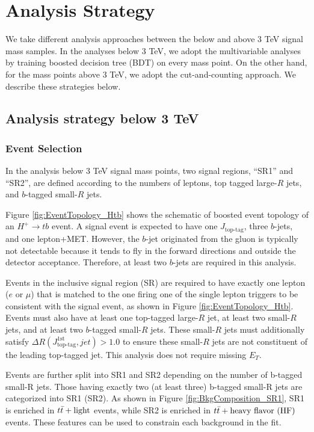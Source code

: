 \section{Analysis Strategy}
\label{sec:AnalysisStrategy}
We take different analysis approaches between the below and above 3 TeV signal mass samples. In the analyses below 3 TeV, we adopt the multivariable analyses by training boosted decision tree (BDT) on every mass point. On the other hand, for the mass points above 3 TeV, we adopt the cut-and-counting approach. We describe these strategies below.

\subsection{Analysis strategy below 3 TeV}
\label{subsec:AnaStrategyUnder3TeV}
\subsubsection{Event Selection}
\label{subsubsec:RegionDefUnder3TeV}
In the analysis below 3 TeV signal mass points, two signal regions, ``SR1'' and ``SR2'', are defined according to the numbers of leptons, top tagged large-$R$ jets, and $b$-tagged small-$R$ jets. 

Figure \ref{fig:EventTopology_Htb} shows the schematic of boosted event topology of an $H^{+}{\rightarrow}tb$ event. A signal event is expected to have one $J_{\text{top-tag}}$, three $b$-jets, and one lepton+MET. However, the $b$-jet originated from the gluon is typically not detectable because it tends to fly in the forward directions and outside the detector acceptance. Therefore, at least two $b$-jets are required in this analysis.

Events in the inclusive signal region (SR) are required to have exactly one lepton ($e$ or ${\mu}$) that is matched to the one firing one of the single lepton triggers to be consistent with the signal event, as shown in Figure \ref{fig:EventTopology_Htb}. Events must also have at least one top-tagged large-$R$ jet, at least two small-$R$ jets, and at least two $b$-tagged small-$R$ jets. These small-$R$ jets must additionally satisfy ${\Delta}R(J_{\text{top-tag}}^{1\text{st}}, jet)>1.0$ to ensure these small-$R$ jets are not constituent of the leading top-tagged jet. This analysis does not require missing $E_{T}$. 

Events are further split into SR1 and SR2 depending on the number of b-tagged small-R jets. Those having exactly two (at least three) b-tagged small-R jets are categorized into SR1 (SR2). As shown in Figure \ref{fig:BkgComposition_SR1}, SR1 is enriched in $t\Bar{t}+\text{light}$ events, while SR2 is enriched in $t\Bar{t}+\text{heavy flavor (HF)}$ events. These features can be used to constrain each background in the fit.


